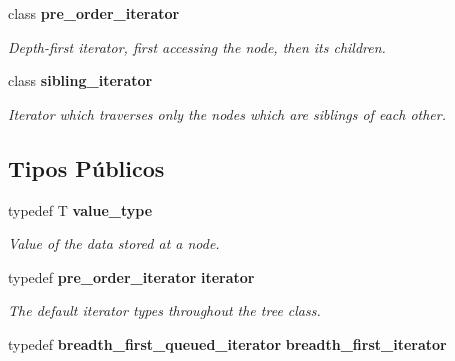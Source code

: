 \begin{DoxyCompactItemize}
class {\bf pre\+\_\+order\+\_\+iterator}
\begin{DoxyCompactList}\small\item\em Depth-\/first iterator, first accessing the node, then its children. \end{DoxyCompactList}\item 
class {\bf sibling\+\_\+iterator}
\begin{DoxyCompactList}\small\item\em Iterator which traverses only the nodes which are siblings of each other. \end{DoxyCompactList}\end{DoxyCompactItemize}
\subsection*{Tipos Públicos}
\begin{DoxyCompactItemize}
\item 
typedef T {\bf value\+\_\+type}
\begin{DoxyCompactList}\small\item\em Value of the data stored at a node. \end{DoxyCompactList}\item 
typedef {\bf pre\+\_\+order\+\_\+iterator} {\bf iterator}
\begin{DoxyCompactList}\small\item\em The default iterator types throughout the tree class. \end{DoxyCompactList}\item 
typedef {\bf breadth\+\_\+first\+\_\+queued\+\_\+iterator} {\bf breadth\+\_\+first\+\_\+iterator}
\end{DoxyCompactItemize}
